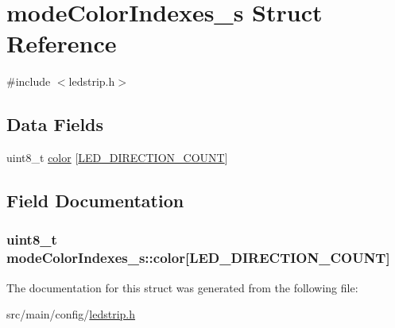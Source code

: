 \hypertarget{structmodeColorIndexes__s}{\section{mode\+Color\+Indexes\+\_\+s Struct Reference}
\label{structmodeColorIndexes__s}
}


{\ttfamily \#include $<$ledstrip.\+h$>$}

\subsection*{Data Fields}
\begin{DoxyCompactItemize}
\item 
uint8\+\_\+t \hyperlink{structmodeColorIndexes__s_a40ee66318e01d38e79787d445c09bd7b}{color} \mbox{[}\hyperlink{config_2ledstrip_8h_a2d701d2f0fa9c14613f8cda8b1e78f0e}{L\+E\+D\+\_\+\+D\+I\+R\+E\+C\+T\+I\+O\+N\+\_\+\+C\+O\+U\+N\+T}\mbox{]}
\end{DoxyCompactItemize}


\subsection{Field Documentation}
\hypertarget{structmodeColorIndexes__s_a40ee66318e01d38e79787d445c09bd7b}{
\subsubsection[{color}]{\setlength{\rightskip}{0pt plus 5cm}uint8\+\_\+t mode\+Color\+Indexes\+\_\+s\+::color\mbox{[}{\bf L\+E\+D\+\_\+\+D\+I\+R\+E\+C\+T\+I\+O\+N\+\_\+\+C\+O\+U\+N\+T}\mbox{]}}}\label{structmodeColorIndexes__s_a40ee66318e01d38e79787d445c09bd7b}


The documentation for this struct was generated from the following file\+:\begin{DoxyCompactItemize}
\item 
src/main/config/\hyperlink{config_2ledstrip_8h}{ledstrip.\+h}\end{DoxyCompactItemize}
